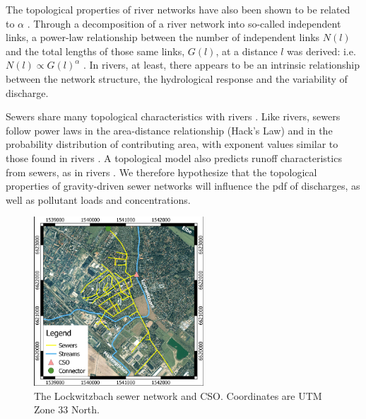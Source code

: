 \documentclass{agujournal2018}
\begin{document}
The topological properties of river networks have also been shown to be related to $\alpha$ \citep{Biswal_2014}. Through a decomposition of a river network into so-called independent links, a power-law relationship between the number of independent links $N(l)$ and the total lengths of those same links, $G(l)$, at a distance $l$ was derived: i.e. $N(l) \propto G(l)^\alpha$  \citep{Biswal_2010}. In rivers, at least, there appears to be an intrinsic relationship between the network structure, the hydrological response and the variability of discharge. 

Sewers share many topological characteristics with rivers \citep{Yang_2017}. Like rivers, sewers follow power laws in the area-distance relationship (Hack’s Law) and in the probability distribution of contributing area, with exponent values similar to those found in rivers \citep{Yang_2017}. A topological model also predicts runof\/f characteristics from sewers, as in rivers \citep{LHOMME_2004}. We therefore hypothesize that the topological properties of gravity-driven sewer networks will inf\/luence the pdf of discharges, as well as pollutant loads and concentrations.


\begin{figure}[h]
 \centering
\includegraphics[width=15pc]{Fig2.pdf}
 \caption{The Lockwitzbach sewer network and CSO. Coordinates are UTM Zone 33 North.}
 \label{figtwo}
  \end{figure}
\end{document}
